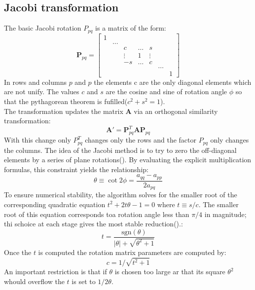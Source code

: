 \subsection{Jacobi transformation}
The basic Jacobi rotation $P_{pq}$ is a matrix of the form: \begin{equation}
  \mathbf{P}_{pq} = 
\begin{bmatrix}
1 & & & & & & \\
 & \dots & & & & & \\
 & & c & \dots & s & & \\
 & & \vdots & 1 & \vdots & & \\
 & & -s & \dots & c & & \\
 & & & & & \dots & \\
 & & & & & & 1
\end{bmatrix}  
\end{equation}
In rows and columns $p$ and $p$ the elements c are the only diagonal elements which are not unify. The values $c$ and $s$ are the cosine and sine of rotation angle $\phi$ so that the pythagorean theorem is fufilled($c^2 + s^2 = 1$).\\
The transformation updates the matrix $\mathbf{A}$ via an orthogonal similarity transformation:
\begin{equation}
\mathbf{A}' = \mathbf{P}_{pq}^T \mathbf{A} \mathbf{P}_{pq}
\end{equation}
With this change only $P_{pq}^T$ changes only the rows and the factor $P_{pq}$ only changes the columns. 
The idea of the Jacobi method is to try to zero the off-diagonal elements by a
series of plane rotations(\cite{explanationJacobi}). By evaluating the explicit multiplication formulas, this constraint yields the relationship:
\begin{equation}
\theta \equiv \cot 2\phi = \frac{a_{qq} - a_{pp}}{2a_{pq}}
\end{equation}
To ensure numerical stability, the algorithm solves for the smaller root of the corresponding quadratic equation $t^2 + 2t\theta - 1 = 0$ where $t \equiv s/c$. The smaller root of this equation corresponds toa rotation angle less than $\pi/4$
in magnitude; thi schoice at each stage gives the most stable reduction(\cite{explanationJacobi}).:
\begin{equation}
t = \frac{\text{sgn}(\theta)}{|\theta| + \sqrt{\theta^2 + 1}}
\end{equation}
Once the $t$ is computed the rotation matrix parameters are computed by: 
\begin{equation}
c = 1 / \sqrt{t^2+1}
\end{equation}
An important restriction is that if $\theta$ is chosen too large ar that its square $\theta^2$ whould overflow the $t$ is set to $1/2\theta$.
